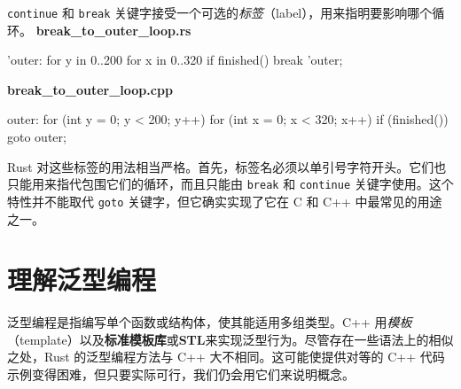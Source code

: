 \texttt{continue} 和 \texttt{break} 关键字接受一个可选的\emph{标签}（label），用来指明要影响哪个循环。
\textbf{break\_\allowbreak{}to\_\allowbreak{}outer\_\allowbreak{}loop.\allowbreak{}rs}
\begin{codebox}[text]
'outer: for y in 0..200 {
    for x in 0..320 {
        if finished() {
            break 'outer;
        }
    }
}
\end{codebox}
\textbf{break\_\allowbreak{}to\_\allowbreak{}outer\_\allowbreak{}loop.\allowbreak{}cpp}
\begin{codebox}[text]
outer:
for (int y = 0; y < 200; y++) {
    for (int x = 0; x < 320; x++) {
        if (finished()) {
            goto outer;
        }
    }
}
\end{codebox}
\label{idx:idx_4a5b9f72}
Rust 对这些标签的用法相当严格。首先，标签名必须以单引号字符开头。它们也只能用来指代包围它们的循环，而且只能由 \texttt{break} 和 \texttt{continue} 关键字使用。这个特性并不能取代 \texttt{goto} 关键字，但它确实实现了它在 C 和 C++ 中最常见的用途之一。
\section{理解泛型编程}
\label{idx:idx_c60ec0c8}
\label{idx:idx_e98fddfb}
泛型编程是指编写单个函数或结构体，使其能适用多组类型。C++ 用\emph{模板}（template）以及\textbf{标准模板库}或\textbf{STL}来实现泛型行为。尽管存在一些语法上的相似之处，Rust 的泛型编程方法与 C++ 大不相同。这可能使提供对等的 C++ 代码示例变得困难，但只要实际可行，我们仍会用它们来说明概念。
